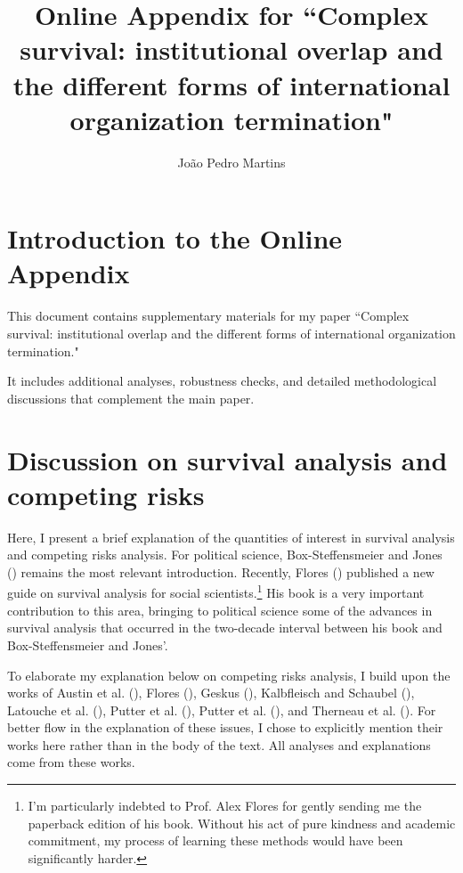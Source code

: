 \documentclass[12pt]{article}
\title{Online Appendix for ``Complex survival: institutional overlap and the different forms of international organization termination"}
\author{João Pedro Martins}
\date{}
\begin{document}
\maketitle

\tableofcontents
\newpage

\section*{Introduction to the Online Appendix}
This document contains supplementary materials for my paper ``Complex survival: institutional overlap and the different forms of international organization termination." 

It includes additional analyses, robustness checks, and detailed methodological discussions that complement the main paper.

\section*{Discussion on survival analysis and competing risks}

Here, I present a brief explanation of the quantities of interest in survival analysis and competing risks analysis. For political science, Box-Steffensmeier and Jones (\citeyear{box2004event}) remains the most relevant introduction. Recently, Flores (\citeyear{flores2022survival}) published a new guide on survival analysis for social scientists.\footnote{I'm particularly indebted to Prof. Alex Flores for gently sending me the paperback edition of his book. Without his act of pure kindness and academic commitment, my process of learning these methods would have been significantly harder.} His book is a very important contribution to this area, bringing to political science some of the advances in survival analysis that occurred in the two-decade interval between his book and Box-Steffensmeier and Jones'.

To elaborate my explanation below on competing risks analysis, I build upon the works of Austin et al. (\citeyear{austin2016introduction}), Flores (\citeyear{flores2022survival}), Geskus (\citeyear{geskus2024competing}), Kalbfleisch and Schaubel (\citeyear{kalbfleisch2023fifty}), Latouche et al. (\citeyear{latouche2013competing}), Putter et al. (\citeyear{putter2007tutorial}), Putter et al. (\cite{putter2020relation}), and Therneau et al. (\citeyear{therneau2024multi}). For better flow in the explanation of these issues, I chose to explicitly mention their works here rather than in the body of the text. All analyses and explanations come from these works.
\end{document}
